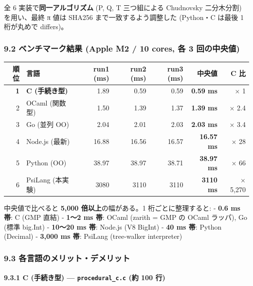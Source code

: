 \documentclass[
]{ltjsarticle}
\newcounter{none} %
\begin{document}
全 6 実装で\textbf{同一アルゴリズム} (P, Q, T 三つ組による Chudnovsky
二分木分割) を用い、最終 π 値は SHA256 まで一致するよう調整した
(Python・C は最後 1 桁が丸めで differs)。

\subsubsection{9.2 ベンチマーク結果 (Apple M2 / 10 cores, 各 3
回の中央値)}\label{ux30d9ux30f3ux30c1ux30deux30fcux30afux7d50ux679c-apple-m2-10-cores-ux5404-3-ux56deux306eux4e2dux592eux5024}

{\def\LTcaptype{none} %
\begin{longtable}[]{@{}rlrrrrr@{}}
\toprule\noalign{}
順位 & 言語 & run1 (ms) & run2 (ms) & run3 (ms) & \textbf{中央値} & C
比 \\
\midrule\noalign{}
\endhead
\bottomrule\noalign{}
\endlastfoot
\textbf{1} & \textbf{C (手続き型)} & 1.89 & 0.59 & 0.59 & \textbf{0.59
ms} & × 1 \\
2 & OCaml (関数型) & 1.50 & 1.39 & 1.37 & \textbf{1.39 ms} & × 2.4 \\
3 & Go (並列 OO) & 2.04 & 2.01 & 2.03 & \textbf{2.03 ms} & × 3.4 \\
4 & Node.js (最新) & 16.88 & 16.56 & 16.57 & \textbf{16.57 ms} & × 28 \\
5 & Python (OO) & 38.97 & 38.97 & 38.71 & \textbf{38.97 ms} & × 66 \\
6 & PsiLang (本実験) & 3080 & 3110 & 3110 & \textbf{3110 ms} & ×
5,270 \\
\end{longtable}
}

中央値で比べると \textbf{5,000 倍以上}の幅がある。1 桁ごとに整理すると:
- \textbf{0.6 ms 帯}: C (GMP 直結) - \textbf{1〜2 ms 帯}: OCaml (zarith
= GMP の OCaml ラッパ), Go (標準 big.Int) - \textbf{10〜20 ms 帯}:
Node.js (V8 BigInt) - \textbf{40 ms 帯}: Python (Decimal) -
\textbf{3,000 ms 帯}: PsiLang (tree-walker interpreter)

\subsubsection{9.3
各言語のメリット・デメリット}\label{ux5404ux8a00ux8a9eux306eux30e1ux30eaux30c3ux30c8ux30c7ux30e1ux30eaux30c3ux30c8}

\paragraph{\texorpdfstring{9.3.1 C (手続き型) ---
\texttt{procedural\_c.c} (約 100
行)}{9.3.1 C (手続き型) --- procedural\_c.c (約 100 行)}}\label{c-ux624bux7d9aux304dux578b-procedural_c.c-ux7d04-100-ux884c}
\end{document}
